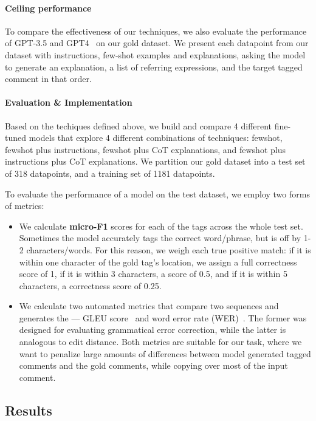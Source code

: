 \paragraph{Ceiling performance} To compare the effectiveness of our techniques, we also evaluate the performance of GPT-3.5 and GPT4~\citep{achiam2023gpt} on our gold dataset. We present each datapoint from our dataset with instructions, few-shot examples and explanations, asking the model to generate an explanation, a list of referring expressions, and the target tagged comment in that order.

\paragraph{Evaluation \& Implementation} Based on the techiques defined above, we build and compare 4 different fine-tuned models that explore 4 different combinations of techniques: fewshot, fewshot plus instructions, fewshot plus CoT explanations, and fewshot plus instructions plus CoT explanations. We partition our gold dataset into a test set of 318 datapoints, and a training set of 1181 datapoints. 

To evaluate the performance of a model on the test dataset, we employ two forms of metrics:

\begin{itemize}
    \item We calculate \textbf{micro-F1} scores for each of the tags across the whole test set. Sometimes the model accurately tags the correct word/phrase, but is off by 1-2 characters/words. For this reason, we weigh each true positive match: if it is within one character of the gold tag's location, we assign a full correctness score of 1, if it is within 3 characters, a score of 0.5, and if it is within 5 characters, a correctness score of 0.25.
    \item We calculate two automated metrics that compare two sequences and generates the --- GLEU score~\citep{napoles-EtAl:2015:ACL-IJCNLP} and word error rate (WER)~\citep{woodard1982}. The former was designed for evaluating grammatical error correction, while the latter is analogous to edit distance. Both metrics are suitable for our task, where we want to penalize large amounts of differences between model generated tagged comments and the gold comments, while copying over most of the input comment.
\end{itemize}

\subsection{Results}
\label{subsec:football-results}

